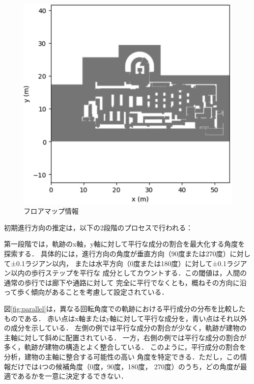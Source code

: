 \begin{figure}[H]
	\centering
	\includegraphics[width=\linewidth]{image/floor-map.jpg}
  \caption{フロアマップ情報} \label{fig:floor-map}
\end{figure}

初期進行方向の推定は，以下の2段階のプロセスで行われる：

第一段階では，軌跡のx軸，y軸に対して平行な成分の割合を最大化する角度を探索する．
具体的には，進行方向の角度が垂直方向（90度または270度）に対して±0.1ラジアン以内，
または水平方向（0度または180度）に対して±0.1ラジアン以内の歩行ステップを平行な
成分としてカウントする．この閾値は，人間の通常の歩行では廊下や通路に対して
完全に平行でなくとも，概ねその方向に沿って歩く傾向があることを考慮して設定されている．

図\ref{fig:parallel}は，異なる回転角度での軌跡における平行成分の分布を比較したものである．
赤い点はx軸またはy軸に対して平行な成分を，青い点はそれ以外の成分を示している．
左側の例では平行な成分の割合が少なく，軌跡が建物の主軸に対して斜めに配置されている．
一方，右側の例では平行な成分の割合が多く，軌跡が建物の構造とよく整合している．
このように，平行成分の割合を分析，建物の主軸に整合する可能性の高い
角度を特定できる．ただし，この情報だけでは4つの候補角度（0度，90度，180度，
270度）のうち，どの角度が最適であるかを一意に決定するできない．

